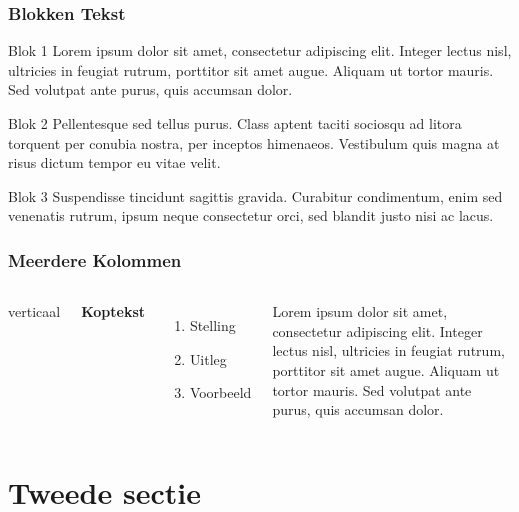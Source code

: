 \documentclass[aspectratio=43]{uva-inf-presentation}
\begin{document}

\begin{frame}
\frametitle{Blokken Tekst}
\begin{block}{Blok 1}
Lorem ipsum dolor sit amet, consectetur adipiscing elit. Integer lectus nisl,
ultricies in feugiat rutrum, porttitor sit amet augue. Aliquam ut tortor mauris.
Sed volutpat ante purus, quis accumsan dolor.
\end{block}

\begin{block}{Blok 2}
Pellentesque sed tellus purus. Class aptent taciti
sociosqu ad litora torquent per conubia nostra, per inceptos himenaeos.
Vestibulum quis magna at risus dictum tempor eu vitae velit.
\end{block}

\begin{block}{Blok 3}
Suspendisse tincidunt sagittis gravida. Curabitur condimentum, enim sed
venenatis rutrum, ipsum neque consectetur orci, sed blandit justo nisi ac lacus.
\end{block}
\end{frame}


\begin{frame}
\frametitle{Meerdere Kolommen}
\begin{columns}[c]
 verticaal

\textbf{Koptekst}
\begin{enumerate}
\item Stelling
\item Uitleg
\item Voorbeeld
\end{enumerate}

Lorem ipsum dolor sit amet, consectetur adipiscing elit. Integer lectus nisl,
ultricies in feugiat rutrum, porttitor sit amet augue. Aliquam ut tortor mauris.
Sed volutpat ante purus, quis accumsan dolor.
\end{columns}
\end{frame}


\section{Tweede sectie}
\end{document}
